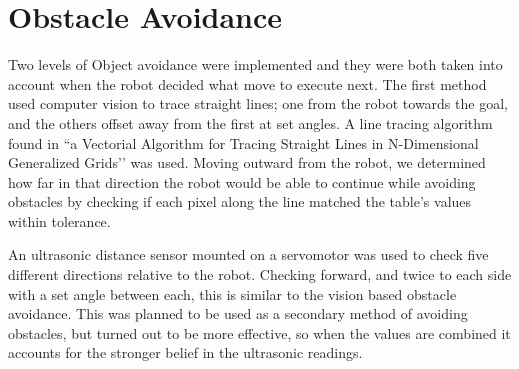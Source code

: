 \section{Obstacle Avoidance}
\label{section::avoidance}

Two levels of Object avoidance were implemented and they were both taken into account when the robot decided what move to execute next. The first method used computer vision to trace straight lines; one from the robot towards the goal, and the others offset away from the first at set angles. A line tracing algorithm found in ``a Vectorial Algorithm for Tracing Straight Lines in N-Dimensional Generalized Grids'\cite{linetrace}' was used. Moving outward from the robot, we determined how far in that direction the robot would be able to continue while avoiding obstacles by checking if each pixel along the line matched the table's values within tolerance.


An ultrasonic distance sensor mounted on a servomotor was used to check five different directions relative to the robot. Checking forward, and twice to each side with a set angle between each, this is similar to the vision based obstacle avoidance. This was planned to be used as a secondary method of avoiding obstacles, but turned out to be more effective, so when the values are combined it accounts for the stronger belief in the ultrasonic readings.

